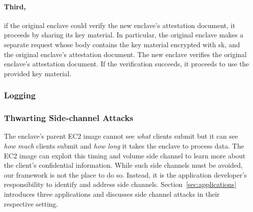 \paragraph{Third,} if the original enclave could verify the new enclave’s attestation document, it proceeds by sharing its key material. In particular, the original enclave makes a separate request whose body contains the key material encrypted with sk, and the original enclave’s attestation document. The new enclave verifies the original enclave’s attestation document. If the verification succeeds, it proceeds to use the provided key material.

\subsubsection{Logging}
\label{sec:logging}


\subsubsection{Thwarting Side-channel Attacks}
\label{sec:side-channels}

The enclave's parent EC2 image cannot see \emph{what} clients submit but it can see \emph{how much} clients submit and \emph{how long} it takes the enclave to process data.  The EC2 image can exploit this timing and volume side channel to learn more about the client's confidential information.  While such side channels must be avoided, our framework is not the place to do so.  Instead, it is the application developer's responsibility to identify and address side channels.  Section~\ref{sec:applications} introduces three applications and discusses side channel attacks in their respective setting.